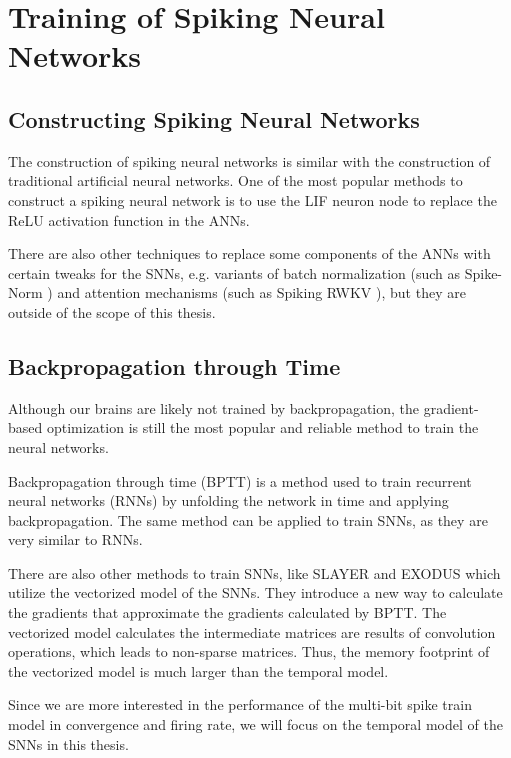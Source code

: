 \section{Training of Spiking Neural Networks}
\label{sec:snn_training}

    \subsection{Constructing Spiking Neural Networks}
    \label{subsec:snn_construct}
        The construction of spiking neural networks is similar with the construction of traditional artificial neural networks. One of the most popular methods to construct a spiking neural network is to use the LIF neuron node to replace the ReLU activation function in the ANNs. 

        There are also other techniques to replace some components of the ANNs with certain tweaks for the SNNs, e.g. variants of batch normalization (such as Spike-Norm \cite{10.3389/fnins.2019.00095}) and attention mechanisms (such as Spiking RWKV \cite{zhu2024spikegptgenerativepretrainedlanguage}), but they are outside of the scope of this thesis. 

    \subsection{Backpropagation through Time}
    \label{subsec:snn_bptt}
        Although our brains are likely not trained by backpropagation, the gradient-based optimization is still the most popular and reliable method to train the neural networks. 

        Backpropagation through time (BPTT) is a method used to train recurrent neural networks (RNNs) \cite{6302929} by unfolding the network in time and applying backpropagation. The same method can be applied to train SNNs, as they are very similar to RNNs. 

        There are also other methods to train SNNs, like SLAYER \cite{Shrestha2018} and EXODUS \cite{bauer2022exodus} which utilize the vectorized model of the SNNs. They introduce a new way to calculate the gradients that approximate the gradients calculated by BPTT. The vectorized model calculates the intermediate matrices are results of convolution operations, which leads to non-sparse matrices. Thus, the memory footprint of the vectorized model is much larger than the temporal model.

        Since we are more interested in the performance of the multi-bit spike train model in convergence and firing rate, we will focus on the temporal model of the SNNs in this thesis. 

